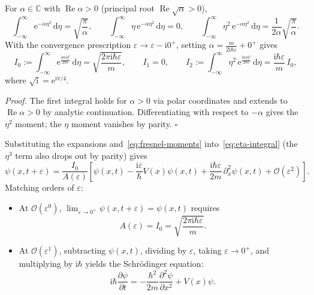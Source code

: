 \documentclass[11pt,a4paper]{article}
\newcommand{\ii}{\mathrm{i}}
\newcommand{\dd}{\mathrm{d}}
\newcommand{\ee}{\mathrm{e}}
\newcommand{\order}{\mathcal{O}}
\begin{document}
\begin{propositionbox}
For $\alpha\in\mathbb{C}$ with $\operatorname{Re}\alpha > 0$ (principal root $\operatorname{Re}\sqrt{\alpha}>0$),
\begin{equation}
    \int_{-\infty}^{\infty} \ee^{-\alpha\eta^2}\,\dd\eta = \sqrt{\frac{\pi}{\alpha}}, \qquad
    \int_{-\infty}^{\infty} \eta\,\ee^{-\alpha\eta^2}\,\dd\eta = 0, \qquad
    \int_{-\infty}^{\infty} \eta^2\,\ee^{-\alpha\eta^2}\,\dd\eta = \frac{1}{2\alpha}\sqrt{\frac{\pi}{\alpha}}.
    \label{eq:gaussian-moments}
\end{equation}
With the convergence prescription $\varepsilon \to \varepsilon - \ii 0^+$, setting $\alpha = \frac{m}{2\ii\hbar\varepsilon} + 0^+$ gives
\begin{equation}
    I_0 := \int_{-\infty}^{\infty}\ee^{\frac{\ii m\eta^2}{2\hbar\varepsilon}}\,\dd\eta
    = \sqrt{\frac{2\pi\ii\hbar\varepsilon}{m}}, \qquad
    I_1 = 0, \qquad
    I_2 := \int_{-\infty}^{\infty}\eta^2\,\ee^{\frac{\ii m\eta^2}{2\hbar\varepsilon}}\,\dd\eta
    = \frac{\ii\hbar\varepsilon}{m}\,I_0,
    \label{eq:fresnel-moments}
\end{equation}
where $\sqrt{\ii} = \ee^{\ii\pi/4}$.
\end{propositionbox}

\textit{Proof.}\;
The first integral holds for $\alpha > 0$ via polar coordinates and extends to $\operatorname{Re}\alpha > 0$ by analytic continuation. Differentiating with respect to $-\alpha$ gives the $\eta^2$ moment; the $\eta$ moment vanishes by parity. \hfill$\square$

Substituting the expansions and~\eqref{eq:fresnel-moments} into~\eqref{eq:eta-integral} (the $\eta^3$ term also drops out by parity) gives
\begin{equation}
    \psi(x,t+\varepsilon)
    = \frac{I_0}{A(\varepsilon)}\left[
        \psi(x,t)
        - \frac{\ii\varepsilon}{\hbar}V(x)\psi(x,t)
        + \frac{\ii\hbar\varepsilon}{2m}\,\partial_x^2\psi(x,t)
        + \order(\varepsilon^2)
    \right].
    \label{eq:feynman-expanded}
\end{equation}
Matching orders of $\varepsilon$:
\begin{itemize}[leftmargin=1.5em, itemsep=2pt]
    \item At $\order(\varepsilon^0)$, $\lim_{\varepsilon\to 0^+}\psi(x,t+\varepsilon) = \psi(x,t)$ requires
    \begin{equation}
        A(\varepsilon) = I_0 = \sqrt{\frac{2\pi\ii\hbar\varepsilon}{m}}.
        \label{eq:A-fixed}
    \end{equation}
    \item At $\order(\varepsilon^1)$, subtracting $\psi(x,t)$, dividing by $\varepsilon$, taking $\varepsilon\to 0^+$, and multiplying by $\ii\hbar$ yields the Schr\"odinger equation:
    \begin{equation}
        \ii\hbar\frac{\partial\psi}{\partial t}
        = -\frac{\hbar^2}{2m}\frac{\partial^2\psi}{\partial x^2} + V(x)\psi.
    \end{equation}
\end{itemize}
\end{document}
